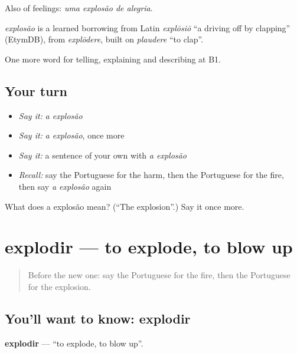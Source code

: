 Also of feelings: \emph{uma explosão de alegria}.

\begin{cousinweb}
\emph{explosão} is a learned borrowing from Latin \emph{explōsiō} \textquotedblleft{}a driving off by clapping\textquotedblright{} (EtymDB), from \emph{explōdere}, built on \emph{plaudere} \textquotedblleft{}to clap\textquotedblright{}.
\end{cousinweb}

\begin{grammarlens}[title={What you've built}]
One more word for telling, explaining and describing at B1.
\end{grammarlens}

\subsection*{Your turn}
\begin{itemize}
\raggedright
  \item \emph{Say it:} \emph{a explosão}
  \item \emph{Say it:} \emph{a explosão}, once more
  \item \emph{Say it:} a sentence of your own with \emph{a explosão}
  \item \emph{Recall:} say the Portuguese for the harm, then the Portuguese for the fire, then say \emph{a explosão} again
\end{itemize}

\begin{tcolorbox}[breakable,colback=teal!4,colframe=teal!35!black,title={Before you move on}]
What does a explosão mean? (\textquotedblleft{}The explosion\textquotedblright{}.) Say it once more.
\end{tcolorbox}
\section[explodir]{explodir — to explode, to blow up}

\label{lesson:PT-C301-explodir}



\begin{quote}
Before the new one: say the Portuguese for the fire, then the Portuguese for the explosion.
\end{quote}

\subsection*{You'll want to know: explodir}
\textbf{explodir} — \textquotedblleft{}to explode, to blow up\textquotedblright{}.

